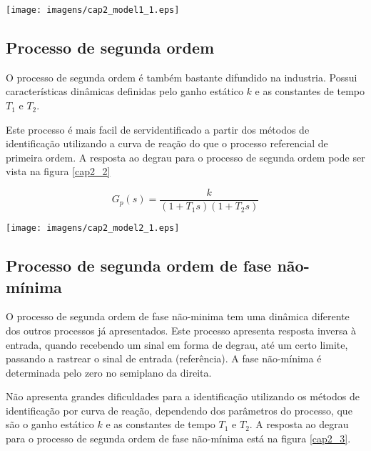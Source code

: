     \begin{center}
        \texttt{[image: imagens/cap2\_model1\_1.eps]}
    \label{cap2_1}
    \end{center}

\subsection{Processo de segunda ordem}
    
    O processo de segunda ordem é também bastante difundido na industria. Possui
    características dinâmicas definidas pelo ganho estático $k$ e as constantes de
    tempo $T_1$ e $T_2$.
    
    Este processo é mais facil de servidentificado a partir dos métodos de
    identificação utilizando a curva de reação do que o processo referencial de
    primeira ordem. A resposta ao degrau para o processo de segunda ordem pode
    ser vista na figura \ref{cap2_2}
    
    \begin{equation}
        G_p(s) = \frac{k}{(1+T_1 s)(1+T_2 s)}
    \end{equation}
    
    \begin{center}
        \texttt{[image: imagens/cap2\_model2\_1.eps]}
    \label{cap2_2}
    \end{center}

\subsection{Processo de segunda ordem de fase não-mínima}

    O processo de segunda ordem de fase não-minima tem uma dinâmica diferente dos
    outros processos já apresentados. Este processo apresenta resposta inversa à
    entrada, quando recebendo um sinal em forma de degrau, até um certo limite,
    passando a rastrear o sinal de entrada (referência). A fase não-mínima é
    determinada pelo zero no semiplano da direita.
    
    Não apresenta grandes dificuldades para a identificação utilizando os métodos
    de identificação por curva de reação, dependendo dos parâmetros do processo,
    que são o ganho estático $k$ e as constantes de tempo $T_1$ e $T_2$. A resposta
    ao degrau para o processo de segunda ordem de fase não-mínima está na figura
    \ref{cap2_3}.

